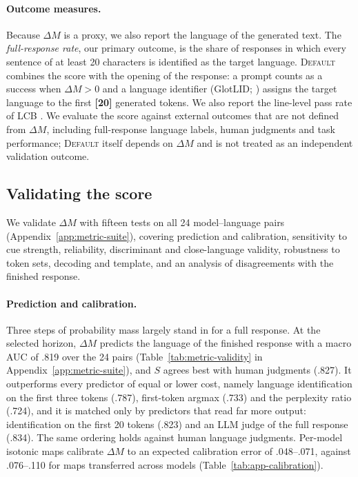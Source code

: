 \documentclass[11pt]{article}
\newcommand{\res}[1]{\textcolor{red!70!black}{\textbf{[#1]}}}
\newcommand{\dM}{\ensuremath{\Delta M}\xspace}
\newcommand{\default}{\textsc{Default}\xspace}
\begin{document}
\paragraph{Outcome measures.}
Because \dM is a proxy, we also report the language of the generated text. The \emph{full-response rate}, our primary outcome, is the share of responses in which every sentence of at least 20 characters is identified as the target language. \default combines the score with the opening of the response: a prompt counts as a success when $\Delta M>0$ and a language identifier (GlotLID; \citealp{kargaran2023glotlid}) assigns the target language to the first \res{20} generated tokens. We also report the line-level pass rate of LCB \citep{marchisio-etal-2024-understanding}. We evaluate the score against external outcomes that are not defined from \dM, including full-response language labels, human judgments and task performance; \default itself depends on \dM and is not treated as an independent validation outcome.

\subsection{Validating the score}
\label{subsec:metric-validation}

We validate \dM with fifteen tests on all 24 model--language pairs (Appendix~\ref{app:metric-suite}), covering prediction and calibration, sensitivity to cue strength, reliability, discriminant and close-language validity, robustness to token sets, decoding and template, and an analysis of disagreements with the finished response.


\paragraph{Prediction and calibration.}
Three steps of probability mass largely stand in for a full response. At the selected horizon, \dM predicts the language of the finished response with a macro AUC of .819 over the 24 pairs (Table~\ref{tab:metric-validity} in Appendix~\ref{app:metric-suite}), and $S$ agrees best with human judgments (.827). It outperforms every predictor of equal or lower cost, namely language identification on the first three tokens (.787), first-token argmax (.733) and the perplexity ratio (.724), and it is matched only by predictors that read far more output: identification on the first 20 tokens (.823) and an LLM judge of the full response (.834). The same ordering holds against human language judgments. Per-model isotonic maps calibrate \dM to an expected calibration error of .048--.071, against .076--.110 for maps transferred across models (Table~\ref{tab:app-calibration}).
\end{document}
